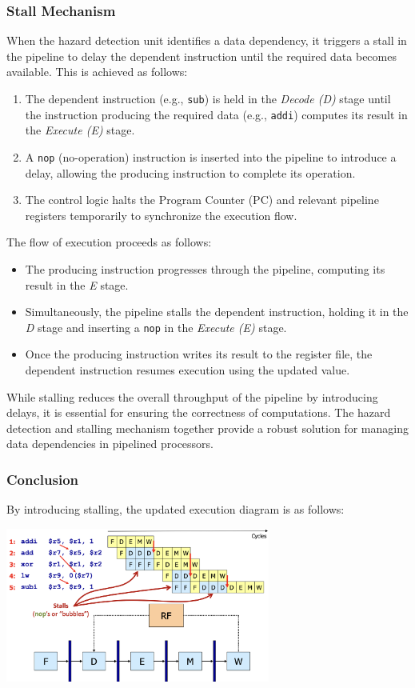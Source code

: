 \subsubsection*{Stall Mechanism}
When the hazard detection unit identifies a data dependency, it triggers a stall in the pipeline to delay the dependent instruction until the required data becomes available. This is achieved as follows:
\begin{enumerate}
    \item The dependent instruction (e.g., \texttt{sub}) is held in the \textit{Decode (D)} stage until the instruction producing the required data (e.g., \texttt{addi}) computes its result in the \textit{Execute (E)} stage.
    \item A \texttt{nop} (no-operation) instruction is inserted into the pipeline to introduce a delay, allowing the producing instruction to complete its operation.
    \item The control logic halts the Program Counter (PC) and relevant pipeline registers temporarily to synchronize the execution flow.
\end{enumerate}

The flow of execution proceeds as follows:
\begin{itemize}
    \item The producing instruction progresses through the pipeline, computing its result in the \textit{E} stage.
    \item Simultaneously, the pipeline stalls the dependent instruction, holding it in the \textit{D} stage and inserting a \texttt{nop} in the \textit{Execute (E)} stage.
    \item Once the producing instruction writes its result to the register file, the dependent instruction resumes execution using the updated value.
\end{itemize}

While stalling reduces the overall throughput of the pipeline by introducing delays, it is essential for ensuring the correctness of computations. The hazard detection and stalling mechanism together provide a robust solution for managing data dependencies in pipelined processors.

\subsubsection{Conclusion}
By introducing stalling, the updated execution diagram is as follows:
\begin{center}
    \includegraphics[width=0.65\textwidth]{chapters/chapter4c/images/diag.png}
\end{center}

